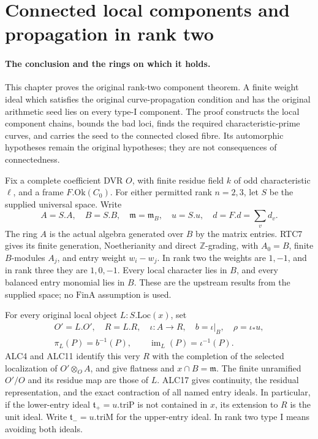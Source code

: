 \section{Connected local components and propagation in rank two}
\label{sec:arithmetic-connectedness}

\paragraph{The conclusion and the rings on which it holds.}
This chapter proves the original rank-two component theorem.  A finite
weight ideal which satisfies the original curve-propagation condition
and has the original arithmetic seed lies on every type-I component.
The proof constructs the local component chains, bounds the bad loci,
finds the required characteristic-prime curves, and carries the seed
to the connected closed fibre.  Its automorphic hypotheses remain the
original hypotheses; they are not consequences of connectedness.

Fix a complete coefficient DVR \(O\), with finite residue field
\(k\) of odd characteristic \(\ell\), and a frame
\(F.\mathrm{Ok}(C_0)\).  For either permitted rank \(n=2,3\),
let \(S\) be the supplied universal space.  Write
\[
 A=S.A,\quad B=S.B,\quad \mathfrak m=\mathfrak m_B,
 \quad u=S.u,\quad d=F.d=\sum_v d_v.
                                                        \tag{ACC.1}
\]
The ring \(A\) is the actual algebra generated over \(B\) by the
matrix entries.  RTC7 gives its finite generation, Noetherianity and
direct \(\mathbb Z\)-grading, with \(A_0=B\), finite \(B\)-modules
\(A_j\), and entry weight \(w_i-w_j\).  In rank two the weights
are \(1,-1\), and in rank three they are \(1,0,-1\).
Every local character lies in \(B\), and every balanced entry monomial
lies in \(B\).  These are the upstream results from the supplied
space; no \(\mathrm{FinA}\) assumption is used.

For every original local object \(L:S.\mathrm{Loc}(x)\), set
\[
 \begin{gathered}
 O'=L.O',\quad R=L.R,\quad \iota:A\longrightarrow R,
 \quad b=\iota|_B,\quad \rho=\iota_*u,\\
 \pi_L(P)=b^{-1}(P),\qquad \operatorname{im}_L(P)=\iota^{-1}(P).
 \end{gathered}
                                                        \tag{ACC.2}
\]
ALC4 and ALC11 identify this very \(R\) with the completion of the
selected localization of \(O'\otimes_O A\), and give flatness and
\(x\cap B=\mathfrak m\).  The finite unramified \(O'/O\) and
its residue map are those of \(L\).  ALC17 gives continuity, the
residual representation, and the exact contraction of all named
entry ideals.  In particular, if the lower-entry ideal
\(\mathfrak t_+=u.\mathrm{triP}\) is not contained in \(x\),
its extension to \(R\) is the unit ideal.  Write
\(\mathfrak t_-=u.\mathrm{triM}\) for the upper-entry ideal.
In rank two type I means avoiding both ideals.

